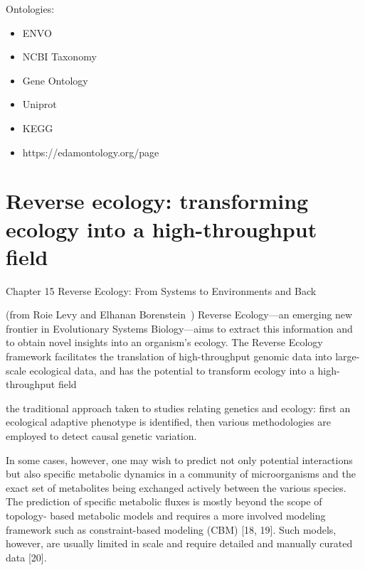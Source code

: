       Ontologies: 

      \begin{itemize}
         \item ENVO
         \item NCBI Taxonomy 
         \item Gene Ontology 
         \item Uniprot
         \item KEGG
         \item https://edamontology.org/page
      \end{itemize}



\section{Reverse ecology: transforming ecology into a high-throughput field}


   Chapter 15
   Reverse Ecology: From Systems
   to Environments and Back


   (from Roie Levy and Elhanan Borenstein~\cite{levy2012reverse})
   Reverse Ecology—an emerging new frontier in Evolutionary Systems Biology—aims
   to extract this information and to obtain novel insights into an organism’s ecology.
   The Reverse Ecology framework facilitates the translation of high-throughput
   genomic data into large-scale ecological data, and has the potential to transform
   ecology into a high-throughput field


   the traditional approach taken to studies relating genetics and ecology:
   first an ecological adaptive phenotype is identified, then various methodologies are
   employed to detect causal genetic variation.






   In some cases, however, one may wish to predict not only potential interactions
   but also specific metabolic dynamics in a community of microorganisms and the
   exact set of metabolites being exchanged actively between the various species. The
   prediction of specific metabolic fluxes is mostly beyond the scope of topology-
   based metabolic models and requires a more involved modeling framework such
   as constraint-based modeling (CBM) [18, 19]. Such models, however, are usually
   limited in scale and require detailed and manually curated data [20].







